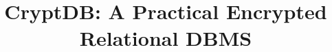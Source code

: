 \documentclass{sig-alternate}
\begin{document}
%

\title{CryptDB: A Practical Encrypted Relational DBMS}



\newcommand{\RND}{\mathsf{RND}}
\newcommand{\DET}{\mathsf{DET}}
\newcommand{\OPE}{\mathsf{OPE}}
\newcommand{\OPEJOIN}{\mathsf{OPE}\mathrm{-}\mathsf{JOIN}}
\newcommand{\HOM}{\mathsf{HOM}}
\newcommand{\JOIN}{\mathsf{JOIN}}
\newcommand{\SEARCH}{\mathsf{SEARCH}}

\newcommand{\up}{\texttt{UPDATE}}
\newcommand{\ins}{\texttt{INSERT}}
\newcommand{\del}{\texttt{DELETE}}
\newcommand{\sel}{\texttt{SELECT}}

%
%
%
%
%
\end{document}
